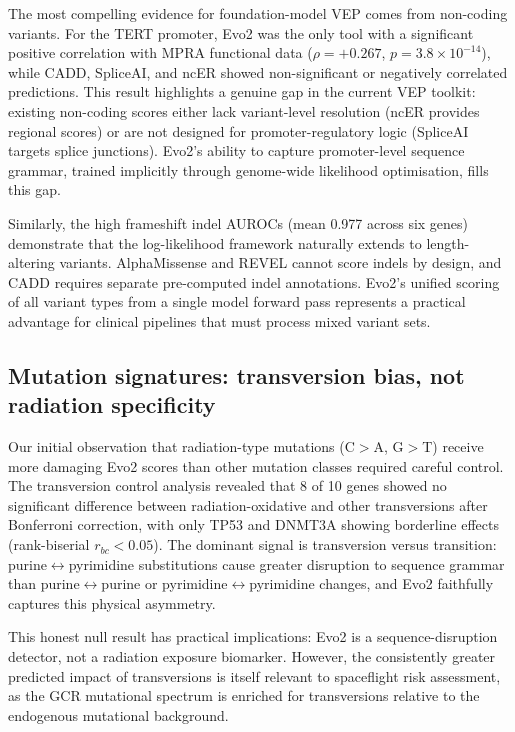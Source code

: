 The most compelling evidence for foundation-model VEP comes from non-coding
variants. For the TERT promoter, Evo2 was the only tool with a significant
positive correlation with MPRA functional data ($\rho = +0.267$,
$p = 3.8 \times 10^{-14}$), while CADD, SpliceAI, and ncER showed
non-significant or negatively correlated predictions. This result highlights a
genuine gap in the current VEP toolkit: existing non-coding scores either lack
variant-level resolution (ncER provides regional scores) or are not designed for
promoter-regulatory logic (SpliceAI targets splice junctions). Evo2's ability to
capture promoter-level sequence grammar, trained implicitly through genome-wide
likelihood optimisation, fills this gap.

Similarly, the high frameshift indel AUROCs (mean 0.977 across six genes) demonstrate
that the log-likelihood framework naturally extends to length-altering variants.
AlphaMissense and REVEL cannot score indels by design, and CADD requires
separate pre-computed indel annotations. Evo2's unified scoring of all variant
types from a single model forward pass represents a practical advantage for
clinical pipelines that must process mixed variant sets.

\subsection*{Mutation signatures: transversion bias, not radiation specificity}

Our initial observation that radiation-type mutations (C$>$A, G$>$T) receive
more damaging Evo2 scores than other mutation classes required careful control.
The transversion control analysis revealed that 8 of 10 genes showed no
significant difference between radiation-oxidative and other transversions after
Bonferroni correction, with only TP53 and DNMT3A showing borderline effects
(rank-biserial $r_{bc} < 0.05$). The dominant signal is transversion versus
transition: purine$\leftrightarrow$pyrimidine substitutions cause greater
disruption to sequence grammar than purine$\leftrightarrow$purine or
pyrimidine$\leftrightarrow$pyrimidine changes, and Evo2 faithfully captures
this physical asymmetry.

This honest null result has practical implications: Evo2 is a sequence-disruption
detector, not a radiation exposure biomarker. However, the consistently greater
predicted impact of transversions is itself relevant to spaceflight risk
assessment, as the GCR mutational spectrum is enriched for transversions relative
to the endogenous mutational background.

